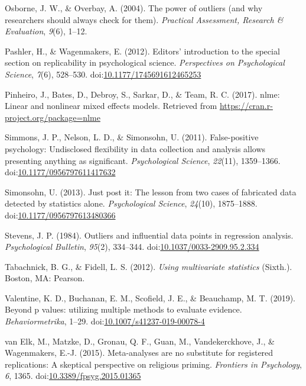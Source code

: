 \documentclass[english,,man]{apa6}
\begin{document}
\leavevmode\hypertarget{ref-Osborne2004}{}%
Osborne, J. W., \& Overbay, A. (2004). The power of outliers (and why researchers should always check for them). \emph{Practical Assessment, Research \& Evaluation}, \emph{9}(6), 1--12.

\leavevmode\hypertarget{ref-Pashler2012a}{}%
Pashler, H., \& Wagenmakers, E. (2012). Editors' introduction to the special section on replicability in psychological science. \emph{Perspectives on Psychological Science}, \emph{7}(6), 528--530. doi:\href{https://doi.org/10.1177/1745691612465253}{10.1177/1745691612465253}

\leavevmode\hypertarget{ref-Pinheiro2017}{}%
Pinheiro, J., Bates, D., Debroy, S., Sarkar, D., \& Team, R. C. (2017). nlme: Linear and nonlinear mixed effects models. Retrieved from \url{https://cran.r-project.org/package=nlme}

\leavevmode\hypertarget{ref-Simmons2011}{}%
Simmons, J. P., Nelson, L. D., \& Simonsohn, U. (2011). False-positive psychology: Undisclosed flexibility in data collection and analysis allows presenting anything as significant. \emph{Psychological Science}, \emph{22}(11), 1359--1366. doi:\href{https://doi.org/10.1177/0956797611417632}{10.1177/0956797611417632}

\leavevmode\hypertarget{ref-Simonsohn2013}{}%
Simonsohn, U. (2013). Just post it: The lesson from two cases of fabricated data detected by statistics alone. \emph{Psychological Science}, \emph{24}(10), 1875--1888. doi:\href{https://doi.org/10.1177/0956797613480366}{10.1177/0956797613480366}

\leavevmode\hypertarget{ref-Stevens1984}{}%
Stevens, J. P. (1984). Outliers and influential data points in regression analysis. \emph{Psychological Bulletin}, \emph{95}(2), 334--344. doi:\href{https://doi.org/10.1037/0033-2909.95.2.334}{10.1037/0033-2909.95.2.334}

\leavevmode\hypertarget{ref-Tabachnick2012}{}%
Tabachnick, B. G., \& Fidell, L. S. (2012). \emph{Using multivariate statistics} (Sixth.). Boston, MA: Pearson.

\leavevmode\hypertarget{ref-Valentine2017}{}%
Valentine, K. D., Buchanan, E. M., Scofield, J. E., \& Beauchamp, M. T. (2019). Beyond p values: utilizing multiple methods to evaluate evidence. \emph{Behaviormetrika}, 1--29. doi:\href{https://doi.org/10.1007/s41237-019-00078-4}{10.1007/s41237-019-00078-4}

\leavevmode\hypertarget{ref-VanElk2015}{}%
van Elk, M., Matzke, D., Gronau, Q. F., Guan, M., Vandekerckhove, J., \& Wagenmakers, E.-J. (2015). Meta-analyses are no substitute for registered replications: A skeptical perspective on religious priming. \emph{Frontiers in Psychology}, \emph{6}, 1365. doi:\href{https://doi.org/10.3389/fpsyg.2015.01365}{10.3389/fpsyg.2015.01365}
\end{document}
